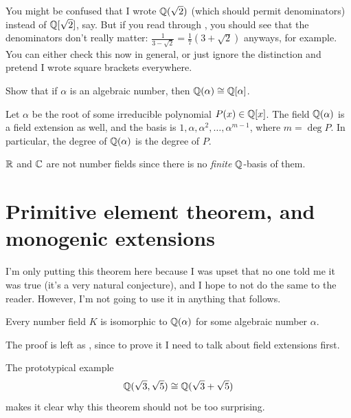 You might be confused that I wrote $\mathbb Q(\sqrt2)$
(which should permit denominators) instead of $\mathbb Q[\sqrt2]$, say.
But if you read through ,
you should see that the denominators don't really matter:
$\frac{1}{3-\sqrt2} = \frac17(3+\sqrt2)$ anyways, for example.
You can either check this now in general,
or just ignore the distinction and pretend I wrote square brackets everywhere.
\begin{exercise}
	[Unimportant]
	Show that if $\alpha$ is an algebraic number,
	then $\mathbb Q(\alpha) \cong \mathbb Q[\alpha]$.
\end{exercise}

\begin{example}
	Let $\alpha$ be the root of some irreducible polynomial $P(x) \in \mathbb Q[x]$.
	The field $\mathbb Q(\alpha)$ is a field extension as well, and the basis
	is $1, \alpha, \alpha^2, \dots, \alpha^{m-1}$, where $m = \deg P$.
	In particular, the degree of $\mathbb Q(\alpha)$ is the degree of $P$.
\end{example}
\begin{example}
	$\mathbb R$ and $\mathbb C$ are not number fields since there is no \emph{finite}
	$\mathbb Q$-basis of them.
\end{example}

\section{Primitive element theorem, and monogenic extensions}

I'm only putting this theorem here because I was upset that no one
told me it was true (it's a very natural conjecture),
and I hope to not do the same to the reader.
However, I'm not going to use it in anything that follows.

\begin{theorem}
	Every number field $K$ is isomorphic to $\mathbb Q(\alpha)$
	for some algebraic number $\alpha$.
	\label{thm:artin_primitive_elm}
\end{theorem}
The proof is left as , since to prove it I need to talk
about field extensions first.

The prototypical example \[ \mathbb Q(\sqrt3,\sqrt5) \cong \mathbb Q(\sqrt3+\sqrt5) \]
makes it clear why this theorem should not be too surprising.

